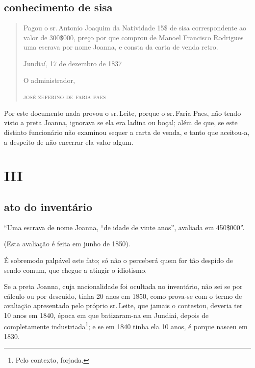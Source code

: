 \subsection{conhecimento de sisa\protect\footnotemark}


\begin{quote}
Pagou o sr.\,Antonio Joaquim da Natividade 15\$ de sisa correspondente
ao valor de 300\$000, preço por que comprou de Manoel Francisco
Rodrigues uma escrava por nome Joanna, e consta da carta de venda
retro.

\begin{flushright}
Jundiaí, 17 de dezembro de 1837

O administrador,

\textsc{josé zeferino de faria paes}
\end{flushright}
\end{quote}

Por este documento nada provou o sr.\,Leite, porque o sr.\,Faria Paes, não
tendo visto a preta Joanna, ignorava se ela era ladina ou boçal; além de
que, se este distinto funcionário não examinou sequer a carta de venda,
e tanto que aceitou-a, a despeito de não encerrar ela valor algum.

\section{III}

\subsection{ato do inventário}

``Uma escrava de nome Joanna, ``de idade de vinte anos'', avaliada em
450\$000''.

(Esta avaliação é feita em junho de 1850).

É sobremodo palpável este fato; só não o perceberá quem for tão despido
de sendo comum, que chegue a atingir o idiotismo.

Se a preta Joanna, cuja nacionalidade foi ocultada no inventário, não
sei se por cálculo ou por descuido, tinha 20 anos em 1850, como prova-se
com o termo de avaliação apresentado pelo próprio sr.\,Leite, que jamais
o contestou, deveria ter 10 anos em 1840, época em que batizaram-na em
Jundiaí, depois de completamente industriada\footnote{ Pelo contexto,
  forjada.}; e se em 1840 tinha ela 10 anos, é porque nasceu em 1830.


